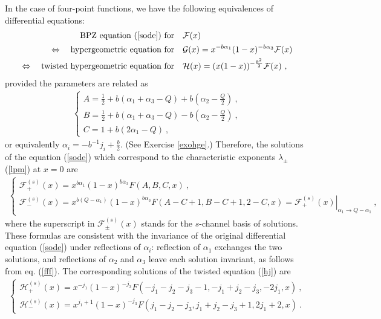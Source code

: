 \documentclass[12pt,a4paper,notitlepage]{report}
\newcommand \bla {\left\{\begin{array}{l} }
\newcommand \ela {\end{array}\right. }
\numberwithin{equation}{section}
\theoremstyle{break}
\begin{document}
In the case of four-point functions, we have the following equivalences of differential equations:
\begin{align}
  \text{BPZ equation (\ref{sode}) for}\quad  & \mathcal{F}(x)
\\ 
\Leftrightarrow\quad  \text{hypergeometric\ equation\ for\quad }&  \mathcal{G}(x)= x^{-b\alpha_1}(1-x)^{-b\alpha_3}\mathcal{F}(x) 
\\
\Leftrightarrow\quad  \text{twisted\ hypergeometric\ equation\ for\quad }& \mathcal{H}(x)=(x(1-x))^{-\frac{b^2}{2}}\mathcal{F}(x) \ ,
\label{fgs}
\end{align}
provided the parameters are related as
\begin{align}
\bla  A = \frac12 + b(\alpha_1+\alpha_3-Q) + b(\alpha_2-\tfrac{Q}{2}) \ , \\
      B = \frac12 + b(\alpha_1+\alpha_3-Q) - b(\alpha_2-\tfrac{Q}{2}) \ , \\
      C = 1 + b(2\alpha_1-Q) \ ,
\ela
\label{abc}
\end{align}
or equivalently $\alpha_i = -b^{-1}j_i +\frac{b}{2}$.
(See Exercise \ref{exohge}.) 
Therefore, the solutions of the equation (\ref{sode}) which correspond to the characteristic exponents $\lambda_\pm$ (\ref{lpm}) at $x=0$ are 
\begin{align}
\bla \mathcal{F}^{(s)}_+(x) = x^{b\alpha_1} (1-x)^{b\alpha_3} F(A,B,C,x)\ ,
\\ \mathcal{F}^{(s)}_-(x)  =x^{b(Q-\alpha_1)} (1-x)^{b\alpha_3} F(A-C+1,B-C+1,2-C,x)= \left. \mathcal{F}^{(s)}_+(x) \right|_{\alpha_1\rightarrow Q-\alpha_1} \ ,
\ela
\label{gpm}
\end{align}
where the superscript in $\mathcal{F}^{(s)}_\pm(x)$ stands for the $s$-channel basis of solutions. These formulas are consistent with the invariance of the original differential equation (\ref{sode}) under reflections of $\alpha_i$: reflection of $\alpha_1$ exchanges the two solutions, and reflections of $\alpha_2$ and $\alpha_3$ leave each solution invariant, as follows from eq. (\ref{fff}). The corresponding solutions of the twisted equation (\ref{hj}) are 
\begin{align}
\bla \mathcal{H}^{(s)}_+(x)  = x^{-j_1}(1-x)^{-j_3} F(-j_1-j_2-j_3-1,-j_1+j_2-j_3,-2j_1,x)\ ,
\\
 \mathcal{H}^{(s)}_-(x)  = x^{j_1+1}(1-x)^{-j_3} F(j_1-j_2-j_3,j_1+j_2-j_3+1,2j_1+2,x)\ .
\ela
\label{fpm}
\end{align}
\end{document}

